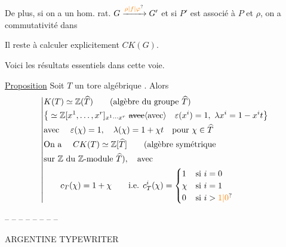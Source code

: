 De plus, si on a un hom. rat. $G\xrightarrow{\unsure{\rho|f|\varphi}}G'$
et si $P'$ est associé à $P$ et $\rho$, on a commutativité dans

Il reste à calculer explicitement $CK(G)$.

Voici les résultats essentiels dans cette voie.

\uline{Proposition} Soit $T$ un tore algébrique . Alors
\[
\left|\begin{aligned}
&K(T)\simeq\mathbb Z(\widehat T)\qquad(\text{algèbre du groupe }\widehat T)\\
&\big\{\simeq\mathbb Z[x^1,\ldots,x^r]_{x^1\cdots x^r}\ \deleted{\text{avec}}\inserted{\text{avec}}\quad
\varepsilon(x^i)=1,\ \lambda x^i=1-x^i t\big\}\\
&\text{avec }\quad\varepsilon(\chi)=1,\quad\lambda(\chi)=1+\chi t\quad\text{pour }\chi\in\widehat T\\
&\text{On a }\quad CK(T)\simeq\mathbb Z[\widehat T]\qquad(\text{algèbre symétrique}\\
&\text{sur }\mathbb Z\text{ du }\mathbb Z\text{-module }\widehat T),\quad\text{avec}\\
&\qquad c_T(\chi)=1+\chi\qquad\text{i.e. }c_T^i(\chi)=
\begin{cases}1&\text{si }i=0\\\chi&\text{si }i=1\\0&\text{si }i>\unsure{1|0}\end{cases}
\end{aligned}\right.
\]
\begin{center}-- -- -- -- -- -- -- --\end{center}
  ARGENTINE  TYPEWRITER  
